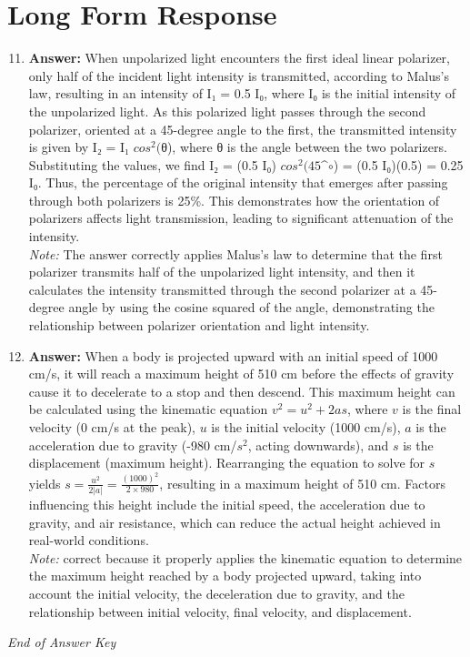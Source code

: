 \documentclass[12pt]{article}
\begin{document}
\section*{Long Form Response}
\begin{enumerate}[label=\arabic*.]
\setcounter{enumi}{10}
\item \textbf{Answer:} When unpolarized light encounters the first ideal linear polarizer, only half of the incident light intensity is transmitted, according to Malus's law, resulting in an intensity of I₁ = 0.5 I₀, where I₀ is the initial intensity of the unpolarized light. As this polarized light passes through the second polarizer, oriented at a 45-degree angle to the first, the transmitted intensity is given by I₂ = I₁ $cos^2($θ), where θ is the angle between the two polarizers. Substituting the values, we find I₂ = (0.5 I₀) $cos^2(45$^\ensuremath{\circ}) = (0.5 I₀)(0.5) = 0.25 I₀. Thus, the percentage of the original intensity that emerges after passing through both polarizers is 25\%. This demonstrates how the orientation of polarizers affects light transmission, leading to significant attenuation of the intensity.
\\ \textit{Note:} The answer correctly applies Malus's law to determine that the first polarizer transmits half of the unpolarized light intensity, and then it calculates the intensity transmitted through the second polarizer at a 45-degree angle by using the cosine squared of the angle, demonstrating the relationship between polarizer orientation and light intensity.
\item \textbf{Answer:} When a body is projected upward with an initial speed of 1000 cm/s, it will reach a maximum height of 510 cm before the effects of gravity cause it to decelerate to a stop and then descend. This maximum height can be calculated using the kinematic equation \( v^2 = u^2 + 2 as \), where \( v \) is the final velocity (0 cm/s at the peak), \( u \) is the initial velocity (1000 cm/s), \( a \) is the acceleration due to gravity (-980 cm/$s^2$, acting downwards), and \( s \) is the displacement (maximum height). Rearranging the equation to solve for \( s \) yields \( s = \frac{u^2}{2|a|} = \frac{(1000)^2}{2 \times 980} \), resulting in a maximum height of 510 cm. Factors influencing this height include the initial speed, the acceleration due to gravity, and air resistance, which can reduce the actual height achieved in real-world conditions.
\\ \textit{Note:} correct because it properly applies the kinematic equation to determine the maximum height reached by a body projected upward, taking into account the initial velocity, the deceleration due to gravity, and the relationship between initial velocity, final velocity, and displacement.
\end{enumerate}

\vfill
\noindent\textit{End of Answer Key}
\end{document}
